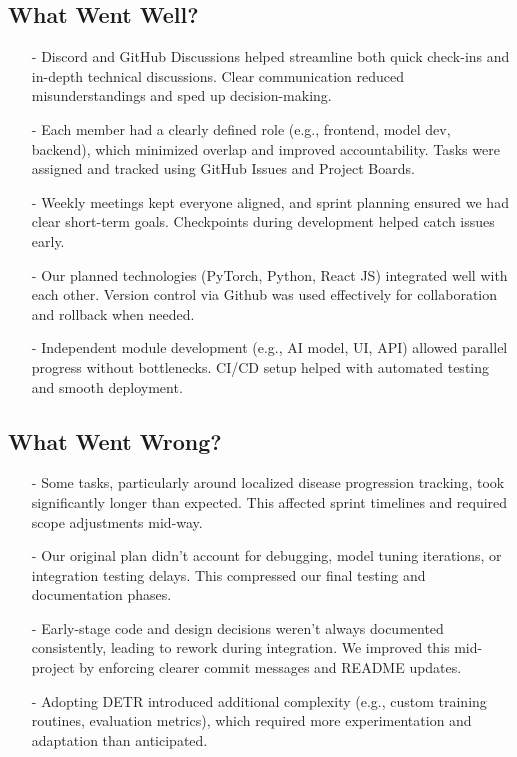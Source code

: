 \documentclass{article}
\begin{document}
\subsection{What Went Well?}
\begin{enumerate}
    \item[-] Discord and GitHub Discussions helped streamline both quick check-ins and in-depth technical discussions. Clear communication reduced misunderstandings and sped up decision-making.
    \item[-] Each member had a clearly defined role (e.g., frontend, model dev, backend), which minimized overlap and improved accountability. Tasks were assigned and tracked using GitHub Issues and Project Boards.
    \item[-] Weekly meetings kept everyone aligned, and sprint planning ensured we had clear short-term goals. Checkpoints during development helped catch issues early.
    \item[-] Our planned technologies (PyTorch, Python, React JS) integrated well with each other. Version control via Github was used effectively for collaboration and rollback when needed.
    \item[-] Independent module development (e.g., AI model, UI, API) allowed parallel progress without bottlenecks. CI/CD setup helped with automated testing and smooth deployment.
    
\end{enumerate}

\subsection{What Went Wrong?}
\begin{enumerate}
    \item[-] Some tasks, particularly around localized disease progression tracking, took significantly longer than expected. This affected sprint timelines and required scope adjustments mid-way.
    \item[-] Our original plan didn't account for debugging, model tuning iterations, or integration testing delays. This compressed our final testing and documentation phases.
    \item[-] Early-stage code and design decisions weren't always documented consistently, leading to rework during integration. We improved this mid-project by enforcing clearer commit messages and README updates.
    \item[-] Adopting DETR introduced additional complexity (e.g., custom training routines, evaluation metrics), which required more experimentation and adaptation than anticipated.
\end{enumerate}
\end{document}
